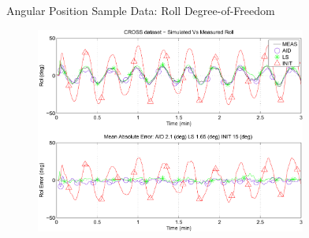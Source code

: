 
\begin{frame}{Angular Position Sample Data: Roll Degree-of-Freedom}
    
    \begin{center}
      \begin{figure}[htbp]
        \begin{center}
          \includegraphics[width=3.5in]{./pres/images/crossALL_posExDOF_2}
        \end{center}
      \end{figure}
    \end{center}
   
\end{frame}

